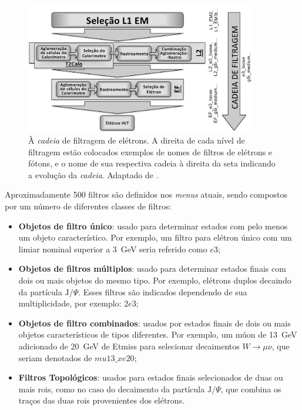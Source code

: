 \begin{figure}[ht!]
\label{fig:electron_chain}
\centering
\includegraphics[width=0.9\textwidth]{imagens/cadeia_eletron.pdf}
\caption[À \emph{cadeia} de filtragem de elétrons.]{À \emph{cadeia} de filtragem
de elétrons. A direita de cada nível de filtragem estão colocados exemplos de
nomes de filtros de elétrons e fótons, e o nome de sua respectiva cadeia à
direita da seta indicando a evolução da \emph{cadeia}. Adaptado de \cite{trigger_perf_2010}.}
\end{figure}

Aproximadamente 500 filtros são definidos nos \emph{menus} atuais, sendo
compostos por um número de diferentes classes de filtros:

\begin{itemize}
\item \textbf{Objetos de filtro único}: usado para determinar estados com pelo
menos um objeto característico. Por exemplo, um filtro para elétron único com um
limiar nominal superior a 3~GeV seria referido como $e3$;
\item \textbf{Objetos de filtros múltiplos}: usado para determinar estados finais
com dois ou mais objetos do mesmo tipo. Por exemplo, elétrons duplos decaindo da
partícula $\text{J}/\Psi$. Esses filtros são indicados dependendo de sua
multiplicidade, por exemplo: $2e3$;
\item \textbf{Objetos de filtro combinados}: usados por estados finais de dois
ou mais objetos característicos de tipos diferentes. Por exemplo, um múon de 13~GeV adicionado de 
20~GeV de \gls{Etmiss} para selecionar decaimentos
$W\rightarrow \mu\nu$, que seriam denotados de $mu13\_xe20$;
\item \textbf{Filtros Topológicos}: usados para estados finais selecionados de
duas ou mais \glspl{roi}, como no caso do decaimento da partícula
$\text{J}/\Psi$, que combina os traços das duas \glspl{roi} provenientes dos
elétrons.
\end{itemize}

